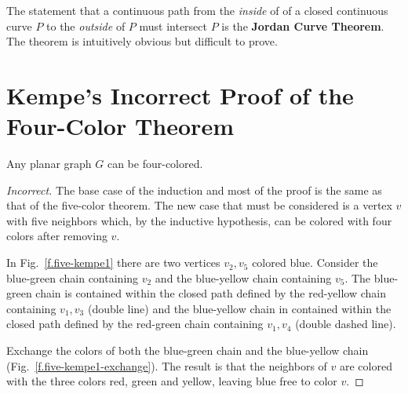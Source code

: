 \begin{advanced}
The statement that a continuous path from the \emph{inside} of of a closed continuous curve $P$ to the \emph{outside} of $P$ must intersect $P$ is the \textbf{Jordan Curve Theorem}. The theorem is intuitively obvious but difficult to prove.
\end{advanced}

\section{Kempe's Incorrect Proof of the Four-Color Theorem}\label{s.kempe}

\begin{theorem}\label{thm.fourcolor}
Any planar graph $G$ can be four-colored.
\end{theorem}

\begin{proof}[Incorrect] The base case of the induction and most of the proof is the same as that of the five-color theorem. The new case that must be considered is a vertex $v$ with five neighbors which, by the inductive hypothesis, can be colored with four colors after removing $v$.

In Fig.~\ref{f.five-kempe1} there are two vertices $v_2,v_5$ colored blue. Consider the blue-green chain containing $v_2$ and the blue-yellow chain containing $v_5$. The blue-green chain is contained within the closed path defined by the red-yellow chain containing $v_1,v_3$ (double line) and the blue-yellow chain in contained within the closed path defined by the red-green chain containing $v_1,v_4$ (double dashed line).

Exchange the colors of both the blue-green chain and the blue-yellow chain (Fig.~\ref{f.five-kempe1-exchange}). The result is that the neighbors of $v$ are colored with the three colors red, green and yellow, leaving blue free to color $v$.
\end{proof}

